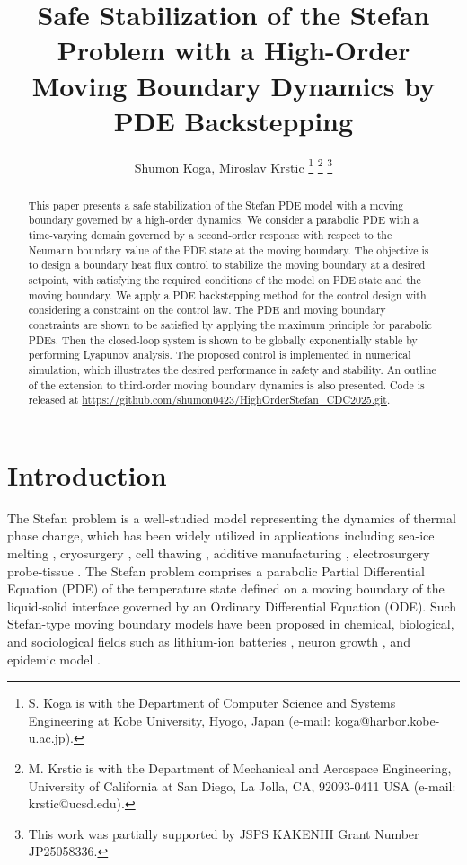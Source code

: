 \documentclass[letterpaper, 10 pt, conference]{cls/ieeeconf}
\title{\LARGE \bf 
Safe Stabilization of the Stefan Problem with a High-Order Moving Boundary Dynamics by PDE Backstepping
}
\author{
Shumon Koga, Miroslav Krstic
\thanks{S. Koga is with the Department
of Computer Science and Systems Engineering at Kobe University,
Hyogo, Japan (e-mail: koga@harbor.kobe-u.ac.jp).} %
\thanks{M. Krstic is with the Department
of Mechanical and Aerospace Engineering, University of California at San Diego, La Jolla,
CA, 92093-0411 USA (e-mail: krstic@ucsd.edu).}
\thanks{This work was partially supported by JSPS KAKENHI Grant Number JP25058336.}}
\theoremstyle{definition}
\begin{document}
\maketitle
\begin{abstract}
This paper presents a safe stabilization of the Stefan PDE model with a moving boundary governed by a high-order dynamics. We consider a parabolic PDE with a time-varying domain governed by a second-order response with respect to the Neumann boundary value of the PDE state at the moving boundary. The objective is to design a boundary heat flux control to stabilize the moving boundary at a desired setpoint, with satisfying the required conditions of the model on PDE state and the moving boundary. We apply a PDE backstepping method for the control design with considering a constraint on the control law. The PDE and moving boundary constraints are shown to be satisfied by applying the maximum principle for parabolic PDEs. Then the closed-loop system is shown to be globally exponentially stable by performing Lyapunov analysis. The proposed control is implemented in numerical simulation, which illustrates the desired performance in safety and stability. An outline of the extension to third-order moving boundary dynamics is also presented. Code is released at \url{https://github.com/shumon0423/HighOrderStefan_CDC2025.git}. 
\end{abstract}

\section{Introduction}
\label{sec: intro}

The Stefan problem is a well-studied model representing the dynamics of thermal phase change, which has been widely utilized in applications including sea-ice melting \cite{koga2019arctic}, cryosurgery \cite{Rabin1998},  cell thawing \cite{srisuma2023thermal}, additive manufacturing \cite{wang2021closed}, electrosurgery probe-tissue \cite{el2021pde}. The Stefan problem comprises a parabolic Partial Differential Equation (PDE) of the temperature state defined on a moving boundary of the liquid-solid interface governed by an Ordinary Differential Equation (ODE). Such Stefan-type moving boundary models have been proposed in chemical, biological, and sociological fields such as lithium-ion batteries \cite{pozzato2024accelerating},  neuron growth \cite{demir2024neuron}, and epidemic model \cite{zhuang2021spatial}. 
\end{document}
